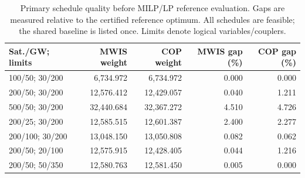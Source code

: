 \begin{table}[t]
  \centering
  \small
  \caption{Primary schedule quality before MILP/LP reference evaluation. Gaps are measured relative to the certified reference optimum. All schedules are feasible; the shared baseline is listed once. Limits denote logical variables/couplers.}
  \label{tab:primary-quality}
  \begin{tabular}{lrrrr}
    \toprule
    Sat./GW; limits & MWIS weight & COP weight & MWIS gap (\%) & COP gap (\%) \\
    \midrule
    100/50; 30/200 & 6,734.972 & 6,734.972 & 0.000 & 0.000 \\
    200/50; 30/200 & 12,576.412 & 12,429.057 & 0.040 & 1.211 \\
    500/50; 30/200 & 32,440.684 & 32,367.272 & 4.510 & 4.726 \\
    200/25; 30/200 & 12,585.515 & 12,601.387 & 2.400 & 2.277 \\
    200/100; 30/200 & 13,048.150 & 13,050.808 & 0.082 & 0.062 \\
    200/50; 20/100 & 12,575.915 & 12,428.405 & 0.044 & 1.216 \\
    200/50; 50/350 & 12,580.763 & 12,581.450 & 0.005 & 0.000 \\
    \bottomrule
  \end{tabular}
\end{table}
